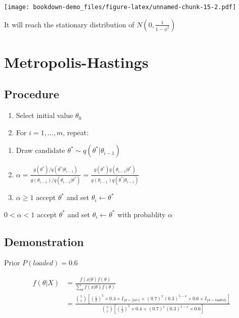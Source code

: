 \documentclass[]{book}
\begin{document}
\texttt{[image: bookdown-demo\_files/figure-latex/unnamed-chunk-15-2.pdf]}

It will reach the stationary distribution of \(N(0, \frac{1}{1-\phi^2})\)

\hypertarget{metropolis-hastings}{%
\section{Metropolis-Hastings}\label{metropolis-hastings}}

\hypertarget{procedure}{%
\subsection{Procedure}\label{procedure}}

\begin{enumerate}
\def\labelenumi{(\arabic{enumi})}
\item
  Select initial value \(\theta_0\)
\item
  For \(i=1,..., m\), repeat:
\end{enumerate}

\begin{enumerate}
\def\labelenumi{(\alph{enumi})}
\item
  Draw candidate \(\theta^* \sim q(\theta^*|\theta_{i-1})\)
\item
  \(\alpha=\frac{g(\theta^*)/q(\theta^*|\theta_{i-1})}{g(\theta_{i-1})/q(\theta_{i-1}|\theta^*)}=\frac{g(\theta^*)q(\theta_{i-1}|\theta^*)}{g(\theta_{i-1})q(\theta^*|\theta_{i-1})}\)
\item
  \(\alpha \geq 1\) accept \(\theta^*\) and set \(\theta_i \leftarrow \theta^*\)
\end{enumerate}

\(0<\alpha < 1\) accept \(\theta^*\) and set \(\theta_i \leftarrow \theta^*\) with probablity \(\alpha\)

\hypertarget{demonstration}{%
\subsection{Demonstration}\label{demonstration}}

Prior \(P(loaded)=0.6\)

\[\begin{aligned} f(\theta | X) &= \frac{f(x|\theta) f(\theta)}{\sum_{\theta} f(x|\theta)f(\theta)} \\ &=\frac{\binom{5}{x} [(\frac{1}{2})^5 \times 0.4 \times I_{\{\theta=fair \}}+ (0.7)^x(0.3)^{5-x} \times 0.6 \times I_{\{\theta=loaded \}}]}{\binom{5}{x} [(\frac{1}{2})^5 \times 0.4 + (0.7)^x(0.3)^{5-x} \times 0.6]}  \end{aligned}\]
\end{document}
